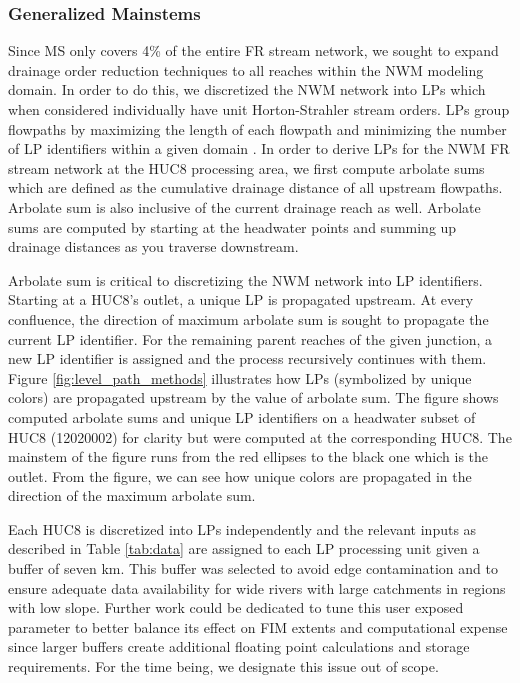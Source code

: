 \subsubsection{Generalized Mainstems}
\label{sssec:generalized_mainstems}
%
Since MS only covers 4\% of the entire FR stream network, we sought to expand drainage order reduction techniques to all reaches within the NWM modeling domain.
In order to do this, we discretized the NWM network into LPs which when considered individually have unit Horton-Strahler stream orders.
LPs group flowpaths by maximizing the length of each flowpath and minimizing the number of LP identifiers within a given domain \cite{moore2019user,mckay2012nhdplus}. 
In order to derive LPs for the NWM FR stream network at the HUC8 processing area, we first compute arbolate sums which are defined as the cumulative drainage distance of all upstream flowpaths.
Arbolate sum is also inclusive of the current drainage reach as well.
Arbolate sums are computed by starting at the headwater points and summing up drainage distances as you traverse downstream.

Arbolate sum is critical to discretizing the NWM network into LP identifiers.
Starting at a HUC8's outlet, a unique LP is propagated upstream. 
At every confluence, the direction of maximum arbolate sum is sought to propagate the current LP identifier.
For the remaining parent reaches of the given junction, a new LP identifier is assigned and the process recursively continues with them.
Figure \ref{fig:level_path_methods} illustrates how LPs (symbolized by unique colors) are propagated upstream by the value of arbolate sum.
The figure shows computed arbolate sums and unique LP identifiers on a headwater subset of HUC8 (12020002) for clarity but were computed at the corresponding HUC8.
The mainstem of the figure runs from the red ellipses to the black one which is the outlet.
From the figure, we can see how unique colors are propagated in the direction of the maximum arbolate sum.

Each HUC8 is discretized into LPs independently and the relevant inputs as described in Table \ref{tab:data} are assigned to each LP processing unit given a buffer of seven km.
This buffer was selected to avoid edge contamination \cite{lindsay2013measuring} and to ensure adequate data availability for wide rivers with large catchments in regions with low slope.
Further work could be dedicated to tune this user exposed parameter to better balance its effect on FIM extents and computational expense since larger buffers create additional floating point calculations and storage requirements.
For the time being, we designate this issue out of scope.

